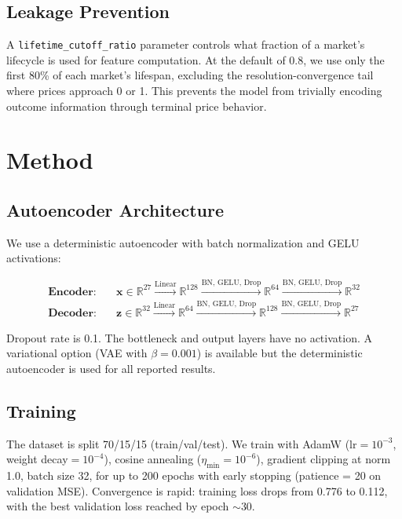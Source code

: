 \documentclass[11pt,a4paper]{article}
\begin{document}
\subsection{Leakage Prevention}

A \texttt{lifetime\_cutoff\_ratio} parameter controls what fraction of a market's lifecycle is used for feature computation. At the default of $0.8$, we use only the first 80\% of each market's lifespan, excluding the resolution-convergence tail where prices approach 0 or 1. This prevents the model from trivially encoding outcome information through terminal price behavior.

\section{Method}

\subsection{Autoencoder Architecture}

We use a deterministic autoencoder with batch normalization and GELU activations:

\begin{align*}
\textbf{Encoder:}\quad & \mathbf{x} \in \mathbb{R}^{27} \xrightarrow{\text{Linear}} \mathbb{R}^{128} \xrightarrow{\text{BN, GELU, Drop}} \mathbb{R}^{64} \xrightarrow{\text{BN, GELU, Drop}} \mathbb{R}^{32} \\
\textbf{Decoder:}\quad & \mathbf{z} \in \mathbb{R}^{32} \xrightarrow{\text{Linear}} \mathbb{R}^{64} \xrightarrow{\text{BN, GELU, Drop}} \mathbb{R}^{128} \xrightarrow{\text{BN, GELU, Drop}} \mathbb{R}^{27}
\end{align*}

Dropout rate is 0.1. The bottleneck and output layers have no activation. A variational option (VAE with $\beta = 0.001$) is available but the deterministic autoencoder is used for all reported results.

\subsection{Training}

The dataset is split 70/15/15 (train/val/test). We train with AdamW (lr$= 10^{-3}$, weight decay$= 10^{-4}$), cosine annealing ($\eta_{\min} = 10^{-6}$), gradient clipping at norm 1.0, batch size 32, for up to 200 epochs with early stopping (patience = 20 on validation MSE). Convergence is rapid: training loss drops from 0.776 to 0.112, with the best validation loss reached by epoch $\sim$30.
\end{document}
